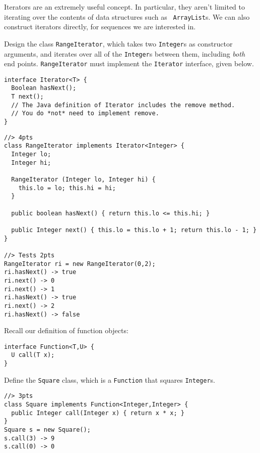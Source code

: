 \documentclass[12pt]{article}                   %
\def\pts#1{\marginpar{\footnotesize \raggedright  \fbox{#1 {\sc Points}}}}
\newenvironment{solution}{\color{red}}{}
\begin{document}
\newpage 

\begin{problem}
\pts{20}

Iterators are an extremely useful concept.  In particular, they aren't
limited to iterating over the contents of data structures such as {\tt
ArrayList}s.  We can also construct iterators directly, for sequences
we are interested in.

\bigskip

Design the class {\tt RangeIterator}, which takes two {\tt Integer}s
as constructor arguments, and iterates over all of the {\tt Integer}s
between them, including \emph{both} end points.  {\tt RangeIterator}
must implement the {\tt Iterator} interface, given below.

\begin{verbatim}
interface Iterator<T> {
  Boolean hasNext();
  T next();
  // The Java definition of Iterator includes the remove method.
  // You do *not* need to implement remove.
}
\end{verbatim}

\begin{solution}
\begin{verbatim}
//> 4pts
class RangeIterator implements Iterator<Integer> {
  Integer lo;
  Integer hi;
  
  RangeIterator (Integer lo, Integer hi) { 
    this.lo = lo; this.hi = hi; 
  }

  public boolean hasNext() { return this.lo <= this.hi; }

  public Integer next() { this.lo = this.lo + 1; return this.lo - 1; }
}

//> Tests 2pts
RangeIterator ri = new RangeIterator(0,2);
ri.hasNext() -> true
ri.next() -> 0
ri.next() -> 1
ri.hasNext() -> true
ri.next() -> 2
ri.hasNext() -> false
\end{verbatim}
\end{solution}
\newpage

\noindent
Recall our definition of function objects:
\begin{verbatim}
interface Function<T,U> {
  U call(T x);
}
\end{verbatim}
\noindent
Define the {\tt Square} class, which is a \verb|Function| that squares
\verb|Integer|s.

\ifrubric
\begin{solution}
\begin{verbatim}
//> 3pts
class Square implements Function<Integer,Integer> {
  public Integer call(Integer x) { return x * x; }
} 
Square s = new Square();
s.call(3) -> 9
s.call(0) -> 0
\end{verbatim}
\end{solution}
\else
\newpage
\fi



\end{problem}
\end{document}
